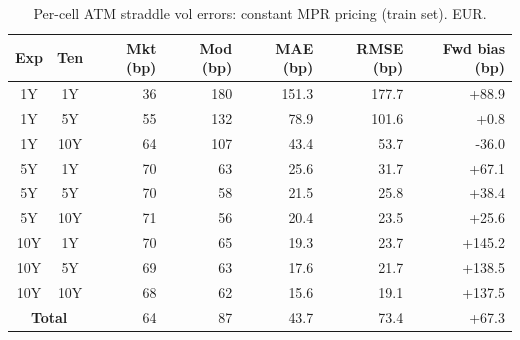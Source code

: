 \begin{table}[H]
\centering
\caption{Per-cell ATM straddle vol errors: constant MPR pricing (train set). EUR.}
\label{tab:constant_mpr_per_cell_train}
\small
\begin{tabular}{@{}ccrrrrr@{}}
\toprule
\textbf{Exp} & \textbf{Ten} & \textbf{Mkt (bp)} & \textbf{Mod (bp)} & \textbf{MAE (bp)} & \textbf{RMSE (bp)} & \textbf{Fwd bias (bp)} \\
\midrule
  1Y & 1Y & 36 & 180 & 151.3 & 177.7 & +88.9 \\
  1Y & 5Y & 55 & 132 & 78.9 & 101.6 & +0.8 \\
  1Y & 10Y & 64 & 107 & 43.4 & 53.7 & -36.0 \\
  \midrule
  5Y & 1Y & 70 & 63 & 25.6 & 31.7 & +67.1 \\
  5Y & 5Y & 70 & 58 & 21.5 & 25.8 & +38.4 \\
  5Y & 10Y & 71 & 56 & 20.4 & 23.5 & +25.6 \\
  \midrule
  10Y & 1Y & 70 & 65 & 19.3 & 23.7 & +145.2 \\
  10Y & 5Y & 69 & 63 & 17.6 & 21.7 & +138.5 \\
  10Y & 10Y & 68 & 62 & 15.6 & 19.1 & +137.5 \\
  \midrule
  \multicolumn{2}{c}{\textbf{Total}} & 64 & 87 & 43.7 & 73.4 & +67.3 \\
\bottomrule
\end{tabular}
\end{table}